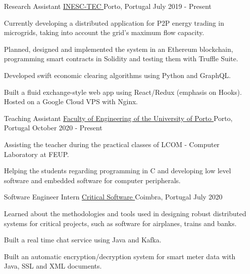 
\begin{cventries}
  \cventry
    {Research Assistant} %
    {\href{https://www.inesctec.pt/en}{INESC-TEC \faExternalLink}} %
    {Porto, Portugal} %
    {July 2019 - Present} %
    {
      \begin{cvitems} %
        \item {Currently developing a distributed application for P2P energy trading in microgrids, taking into account the grid's maximum flow capacity.}
        \item {Planned, designed and implemented the system in an Ethereum blockchain, programming smart contracts in Solidity and testing them with Truffle Suite.}
        \item {Developed swift economic clearing algorithms using Python and GraphQL.}
        \item {Built a fluid exchange-style web app using React/Redux (emphasis on Hooks). Hosted on a Google Cloud VPS with Nginx.}
      \end{cvitems}
    }

    \cventry
    {Teaching Assistant} %
    {\href{https://sigarra.up.pt/feup/en/ucurr_geral.ficha_uc_view?pv_ocorrencia_id=459473}{Faculty of Engineering of the University of Porto \faExternalLink}} %
    {Porto, Portugal} %
    {October 2020 - Present} %
    {
      \begin{cvitems} %
        \item {Assisting the teacher during the practical classes of LCOM - Computer Laboratory at FEUP.}
        \item {Helping the students regarding programming in C and developing low level software and embedded software for computer peripherals.}
      \end{cvitems}
    }

  \cventry
    {Software Engineer Intern} %
    {\href{https://www.criticalsoftware.com/en}{Critical Software \faExternalLink}} %
    {Coimbra, Portugal} %
    {July 2020} %
    {
      \begin{cvitems} %
        \item {Learned about the methodologies and tools used in designing robust distributed systems for critical projects, such as software for airplanes, trains and banks.}
        \item {Built a real time chat service using Java and Kafka.}
        \item {Built an automatic encryption/decryption system for smart meter data with Java, SSL and XML documents.}
      \end{cvitems}
    }


\end{cventries}
